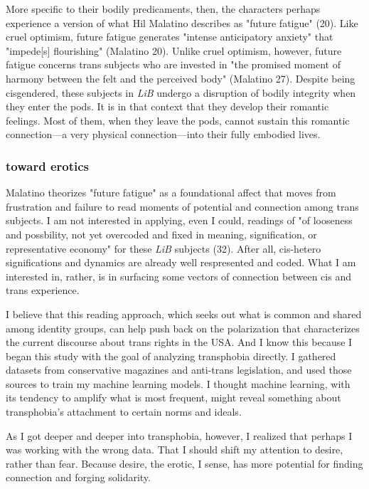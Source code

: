 \documentclass[11pt]{article}
\begin{document}
More specific to their bodily predicaments, then, the characters
perhaps experience a version of what Hil Malatino describes as "future
fatigue" (20). Like cruel optimism, future fatigue generates "intense
anticipatory anxiety" that "impede[s] flourishing" (Malatino 20).
Unlike cruel optimism, however, future fatigue concerns trans subjects
who are invested in "the promised moment of harmony between the felt
and the perceived body" (Malatino 27). Despite being cisgendered,
these subjects in \emph{LiB} undergo a disruption of bodily integrity when
they enter the pods. It is in that context that they develop their
romantic feelings. Most of them, when they leave the pods, cannot
sustain this romantic connection---a very physical connection---into
their fully embodied lives. 

\subsubsection{toward erotics}
\label{sec:org59b78b7}
Malatino theorizes "future fatigue" as a foundational affect that
moves from frustration and failure to read moments of potential and
connection among trans subjects. I am not interested in applying, even
I could, readings of "of looseness and possbility, not yet overcoded
and fixed in meaning, signification, or representative economy" for
these \emph{LiB} subjects (32). After all, cis-hetero significations and
dynamics are already well respresented and coded. What I am interested
in, rather, is in surfacing some vectors of connection between cis and
trans experience.

I believe that this reading approach, which seeks out what is common
and shared among identity groups, can help push back on the
polarization that characterizes the current discourse about trans
rights in the USA. And I know this because I began this study with the
goal of analyzing transphobia directly. I gathered datasets from
conservative magazines and anti-trans legislation, and used those
sources to train my machine learning models. I thought machine
learning, with its tendency to amplify what is most frequent, might
reveal something about transphobia's attachment to certain norms and
ideals. 

As I got deeper and deeper into transphobia, however, I realized that
perhaps I was working with the wrong data. That I should shift my
attention to desire, rather than fear. Because desire, the erotic, I
sense, has more potential for finding connection and forging
solidarity.
\end{document}
